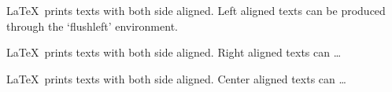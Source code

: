 \documentclass{article}
\begin{document}
\begin{flushleft}
\LaTeX\ prints texts with both side aligned.
Left aligned texts can be produced through
the ‘flushleft’ environment.
\end{flushleft}

\begin{flushright}
\LaTeX\ prints texts with both side aligned.
Right aligned texts can …
\end{flushright}

\begin{center}
\LaTeX\ prints texts with both side aligned.
Center aligned texts can …
\end{center}
\end{document}
